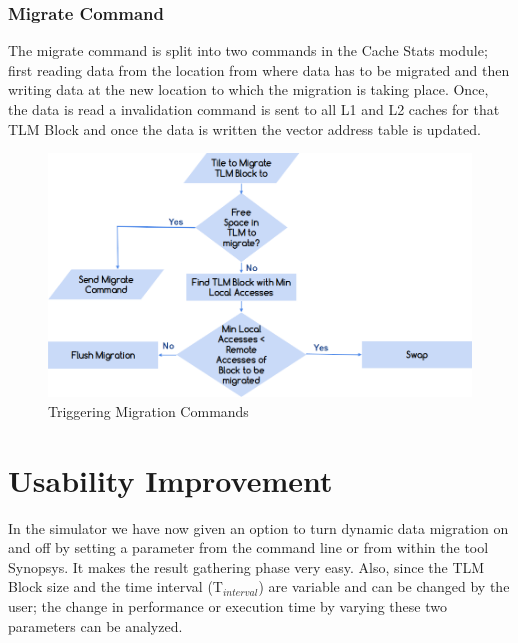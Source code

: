 \documentclass{listhesis}
\begin{document}
\subsubsection{Migrate Command}
The migrate command is split into two commands in the Cache Stats module; first reading data from the location from where data has to be migrated and then writing data at the new location to which the migration is taking place. Once, the data is read a invalidation command is sent to all L1 and L2 caches for that TLM Block and once the data is written the vector address table is updated. \\
\begin{figure}
  \includegraphics[width=\linewidth]{tlmstats.png}
  \centering
  \caption{Triggering Migration Commands}
  \label{fig:tlm_stats flowchart}
\end{figure}
\section{Usability Improvement}
In the simulator we have now given an option to turn dynamic data migration on and off by setting a parameter from the command line or from within the tool Synopsys. It makes the result gathering phase very easy. Also, since the TLM Block size and the time interval (T$_{interval}$) are variable and can be changed by the user; the change in performance or execution time by varying these two parameters can be analyzed.
\end{document}
